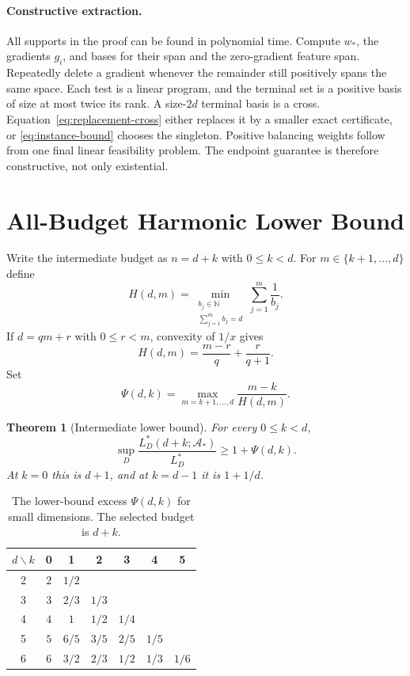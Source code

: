 \documentclass[twoside]{article}
\newtheorem{theorem}{Theorem}
\newcommand{\cA}{\mathcal A}
\begin{document}
\paragraph{Constructive extraction.}
All supports in the proof can be found in polynomial time. Compute $w_*$, the gradients $g_i$, and bases for their span and the zero-gradient feature span. Repeatedly delete a gradient whenever the remainder still positively spans the same space. Each test is a linear program, and the terminal set is a positive basis of size at most twice its rank. A size-$2d$ terminal basis is a cross. Equation~\eqref{eq:replacement-cross} either replaces it by a smaller exact certificate, or \eqref{eq:instance-bound} chooses the singleton. Positive balancing weights follow from one final linear feasibility problem. The endpoint guarantee is therefore constructive, not only existential.

\section{All-Budget Harmonic Lower Bound}

Write the intermediate budget as $n=d+k$ with $0\leq k<d$. For $m\in\{k+1,\ldots,d\}$ define
\begin{equation}
 H(d,m)=\min_{\substack{b_j\in\mathbb N\\\sum_{j=1}^m b_j=d}}
 \sum_{j=1}^m\frac1{b_j}.
 \label{eq:harmonic}
\end{equation}
If $d=qm+r$ with $0\leq r<m$, convexity of $1/x$ gives
\begin{equation}
 H(d,m)=\frac{m-r}{q}+\frac{r}{q+1}.
 \label{eq:harmonic-closed}
\end{equation}
Set
\begin{equation}
 \Psi(d,k)=\max_{m=k+1,\ldots,d}\frac{m-k}{H(d,m)}.
 \label{eq:psi}
\end{equation}

\begin{theorem}[Intermediate lower bound]
\label{thm:lower}
For every $0\leq k<d$,
\begin{equation}
 \sup_D\frac{L_D^*(d+k;\cA_*)}{L_D^*}
 \geq 1+\Psi(d,k).
 \label{eq:general-lower}
\end{equation}
At $k=0$ this is $d+1$, and at $k=d-1$ it is $1+1/d$.
\end{theorem}

\begin{table}[t]
\caption{The lower-bound excess $\Psi(d,k)$ for small dimensions. The
selected budget is $d+k$.}
\label{tab:psi}
\centering
\small
\begin{tabular}{c@{\quad}cccccc}
\toprule
$d\backslash k$ & 0 & 1 & 2 & 3 & 4 & 5\\
\midrule
2 & $2$ & $1/2$ \\
3 & $3$ & $2/3$ & $1/3$ \\
4 & $4$ & $1$ & $1/2$ & $1/4$ \\
5 & $5$ & $6/5$ & $3/5$ & $2/5$ & $1/5$ \\
6 & $6$ & $3/2$ & $2/3$ & $1/2$ & $1/3$ & $1/6$ \\
\bottomrule
\end{tabular}
\end{table}
\end{document}
